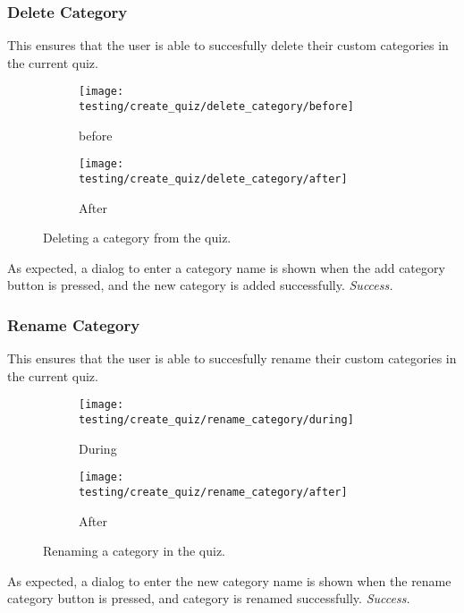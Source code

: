 \subsubsection{Delete Category} %
\label{ssub:add_category}
This ensures that the user is able to succesfully delete their custom categories in the current quiz.
\begin{figure}[!htbp]
\centering
\begin{subfigure}{0.5\textwidth}
  \centering
  \texttt{[image: testing/create\_quiz/delete\_category/before]}
  \caption{before}
  \label{fig:sub1}
\end{subfigure}%
\begin{subfigure}{0.5\textwidth}
  \centering
  \texttt{[image: testing/create\_quiz/delete\_category/after]}
  \caption{After}
  \label{fig:sub2}
\end{subfigure}
\caption{Deleting a category from the quiz.}
\label{fig:test}
\end{figure}
As expected, a dialog to enter a category name is shown when the add category button is pressed, and the new category is added successfully. \textit{Success.}


\subsubsection{Rename Category} %
\label{ssub:add_category}
This ensures that the user is able to succesfully rename their custom categories in the current quiz.
\begin{figure}[!htbp]
\centering
\begin{subfigure}{0.5\textwidth}
  \centering
  \texttt{[image: testing/create\_quiz/rename\_category/during]}
  \caption{During}
  \label{fig:sub1}
\end{subfigure}%
\begin{subfigure}{0.5\textwidth}
  \centering
  \texttt{[image: testing/create\_quiz/rename\_category/after]}
  \caption{After}
  \label{fig:sub2}
\end{subfigure}
\caption{Renaming a category in the quiz.}
\label{fig:test}
\end{figure}
As expected, a dialog to enter the new category name is shown when the rename category button is pressed, and category is renamed successfully. \textit{Success.}



